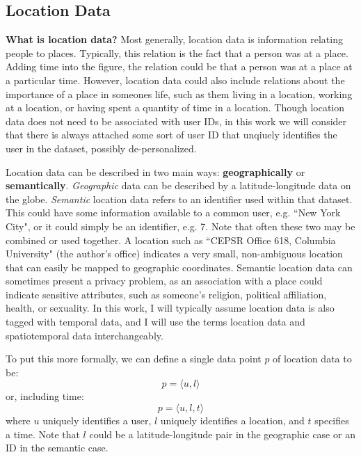 \subsection{Location Data}
\textbf{What is location data?}
Most generally, location data is information relating people to places.
Typically, this relation is the fact that a person was at a place.
Adding time into the figure, the relation could be that a person was at a place at a particular time.
However, location data could also include relations about the importance of a place in someones life, such as them living in a location, working at a location, or having spent a quantity of time in a location.
Though location data does not need to be associated with user IDs, in this work we will consider that there is always attached some sort of user ID that unqiuely identifies the user in the dataset, possibly de-personalized.

Location data can be described in two main ways: \textbf{geographically} or \textbf{semantically}.
\emph{Geographic} data can be described by a latitude-longitude data on the globe.
\emph{Semantic} location data refers to an identifier used within that dataset.
This could have some information available to a common user, e.g. ``New York City", or it could simply be an identifier, e.g. 7.
Note that often these two may be combined or used together.
A location such as ``CEPSR Office 618, Columbia University" (the author's office) indicates a very small, non-ambiguous location that can easily be mapped to geographic coordinates.
Semantic location data can sometimes present a privacy problem, as an association with a place could indicate sensitive attributes, such as someone's religion, political affiliation, health, or sexuality.
In this work, I will typically assume location data is also tagged with temporal data, and I will use the terms location data and spatiotemporal data interchangeably.

To put this more formally, we can define a single data point $p$ of location data to be:
\[ p = \langle u, l \rangle \]
or, including time:
\[ p = \langle u, l, t \rangle \]
where $u$ uniquely identifies a user, $l$ uniquely identifies a location, and $t$ specifies a time.
Note that $l$ could be a latitude-longitude pair in the geographic case or an ID in the semantic case.

